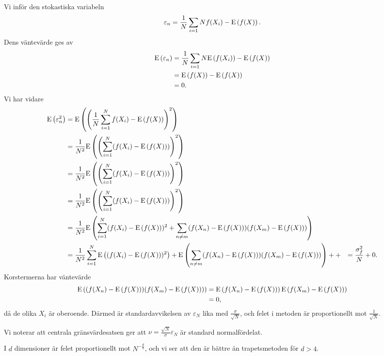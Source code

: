 Vi inför den stokastiska variabeln
\begin{align*}
	\varepsilon_{n} = \frac{1}{N}\sum\limits_{i = 1}{N}f(X_{i}) - \text{E}\left(f(X)\right).
\end{align*}
Dens väntevärde ges av
\begin{align*}
	\text{E}\left(\varepsilon_{n}\right) &= \frac{1}{N}\sum\limits_{i = 1}{N}\text{E}\left(f(X_{i})\right) - \text{E}\left(f(X)\right) \\
	                         &= \text{E}\left(f(X)\right) - \text{E}\left(f(X)\right) \\
	                         &= 0.
\end{align*}
Vi har vidare
\begin{align*}
	\text{E}\left(\varepsilon_{n}^{2}\right) &= \text{E}\left(\left(\frac{1}{N}\sum\limits_{i = 1}^{N}f(X_{i}) - \text{E}\left(f(X)\right)\right)^{2}\right) \\
	                         &= \frac{1}{N^{2}}\text{E}\left(\left(\sum\limits_{i = 1}^{N}(f(X_{i}) - \text{E}\left(f(X)\right))\right)^{2}\right) \\
	                         &= \frac{1}{N^{2}}\text{E}\left(\left(\sum\limits_{i = 1}^{N}(f(X_{i}) - \text{E}\left(f(X)\right))\right)^{2}\right) \\
	                         &= \frac{1}{N^{2}}\text{E}\left(\left(\sum\limits_{i = 1}^{N}(f(X_{i}) - \text{E}\left(f(X)\right))\right)^{2}\right) \\
	                         &= \frac{1}{N^{2}}\text{E}\left(\sum\limits_{i = 1}^{N}(f(X_{i}) - \text{E}\left(f(X)\right))^{2} + \sum\limits_{n\neq m}(f(X_{n}) - \text{E}\left(f(X)\right))(f(X_{m}) - \text{E}\left(f(X)\right))\right) \\
	                         &= \frac{1}{N^{2}}\sum\limits_{i = 1}^{N}\text{E}\left((f(X_{i}) - \text{E}\left(f(X)\right))^{2}\right) + \text{E}\left(\sum\limits_{n\neq m}(f(X_{n}) - \text{E}\left(f(X)\right))(f(X_{m}) - \text{E}\left(f(X)\right))\right) ++
	                         &= \frac{\sigma_{f}^{2}}{N} + 0.
\end{align*}
Korstermerna har väntevärde
\begin{align*}
	\text{E}\left((f(X_{n}) - \text{E}\left(f(X)\right))(f(X_{m}) - \text{E}\left(f(X)\right))\right) &= \text{E}\left(f(X_{n}) - \text{E}\left(f(X)\right)\right)\text{E}\left(f(X_{m}) - \text{E}\left(f(X)\right)\right) \\
	                                                           &= 0,
\end{align*}
då de olika $X_{i}$ är oberoende. Därmed är standardavvikelsen av $\varepsilon_{N}$ lika med $\frac{\sigma}{\sqrt{N}}$, och felet i metoden är proportionellt mot $\frac{1}{\sqrt{N}}$.

Vi noterar att centrala gränsvärdesatsen ger att $\nu = \frac{\sqrt{N}}{\sigma}\varepsilon_{N}$ är standard normalfördelat.

I $d$ dimensioner är felet proportionellt mot $N^{-\frac{d}{2}}$, och vi ser att den är bättre än trapetsmetoden för $d > 4$.